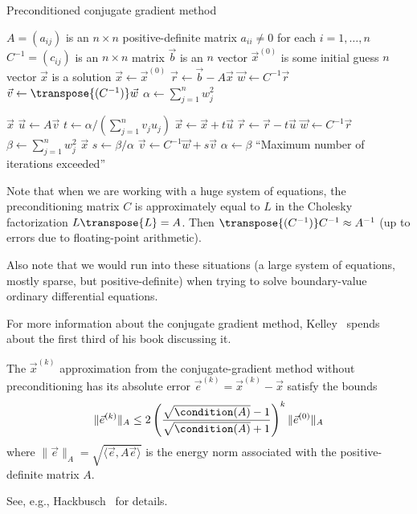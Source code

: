 \begin{algorithm}\label{alg:iterative-linear:conjugate-gradient}
  \caption{Preconditioned conjugate gradient method}
  \begin{algorithmic}[1]
    \Require $A=(a_{ij})$ is an $n\times n$ positive-definite matrix
    \Require $a_{ii}\neq0$ for each $i=1,\dots,n$
    \Require $C^{-1}=(c_{ij})$ is an $n\times n$ matrix
    \Require $\vec{b}$ is an $n$ vector
    \Require $\vec{x}^{(0)}$ is some initial guess $n$ vector
    \Ensure $\vec{x}$ is a solution
    \State $\vec{x}\gets\vec{x}^{(0)}$ 
    \State $\vec{r}\gets \vec{b}-A\vec{x}$
    \State $\vec{w}\gets C^{-1}\vec{r}$
    \State $\vec{v}\gets\transpose{(C^{-1})}\vec{w}$
    \State $\alpha\gets\sum^{n}_{j=1}w_{j}^{2}$

        \State\Return $\vec{x}$
      \EndIf
      \State $\vec{u}\gets A\vec{v}$
      \State $t\gets \alpha/(\sum^{n}_{j=1}v_{j}u_{j})$
      \State $\vec{x}\gets\vec{x}+t\vec{u}$
      \State $\vec{r}\gets\vec{r}-t\vec{u}$
      \State $\vec{w}\gets C^{-1}\vec{r}$
      \State $\beta\gets\sum^{n}_{j=1}w_{j}^{2}$
          \State\Return $\vec{x}$
        \EndIf
      \EndIf
      \State $s\gets\beta/\alpha$
      \State $\vec{v}\gets C^{-1}\vec{w}+s\vec{v}$
      \State $\alpha\gets\beta$
    \EndFor
    \State\Fail ``Maximum number of iterations exceeded''
  \EndFunction
\end{algorithmic}
\end{algorithm}

Note that when we are working with a huge system of equations, the
preconditioning matrix $C$ is approximately equal to $L$ in the Cholesky
factorization $L\transpose{L}=A$. Then
$\transpose{(C^{-1})}C^{-1}\approx A^{-1}$ (up to errors due to
floating-point arithmetic).

Also note that we would run into these situations (a large system of
equations, mostly sparse, but positive-definite) when trying to solve
boundary-value ordinary differential equations.

For more information about the conjugate gradient method,
Kelley~\cite{kelley1995} spends about the first third of his book
discussing it.

\begin{theorem}
The $\vec{x}^{(k)}$ approximation from the conjugate-gradient method
without preconditioning has its absolute error
$\vec{e}^{(k)}=\vec{x}^{(k)}-\vec{x}$ satisfy the bounds
\begin{equation}
\|\vec{e}^{(k)}\|_{A}\leq2\left(\frac{\sqrt{\condition(A)}-1}{\sqrt{\condition(A)}+1}\right)^{k}\|\vec{e}^{(0)}\|_{A}
\end{equation}
where $\|\vec{e}\|_{A}=\sqrt{\langle\vec{e},A\vec{e}\rangle}$ is the
energy norm associated with the positive-definite matrix $A$.
\end{theorem}

See, e.g., Hackbusch~\cite[\S10.2.3]{hackbusch2016iterative} for details.